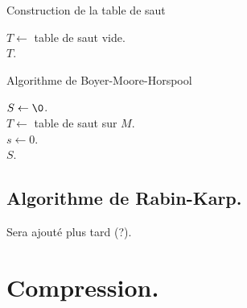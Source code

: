 \documentclass[french, 11pt]{article}
\begin{document}
\begin{defi}{}{}
    \begin{algorithm}[H]
        \caption{Construction de la table de saut}
        $T \gets $ table de saut vide.\\
        \Retour $T$.
    \end{algorithm}

    \begin{algorithm}[H]
        \caption{Algorithme de Boyer-Moore-Horspool}
        $S \gets \0$.\\
        $T \gets $ table de saut sur $M$.\\
        $s \gets 0$.\\
        \Retour $S$.
    \end{algorithm}
\end{defi}

\subsection{Algorithme de Rabin-Karp.}

\begin{center}
    Sera ajouté plus tard (?).
\end{center}

\section{Compression.}
\end{document}
